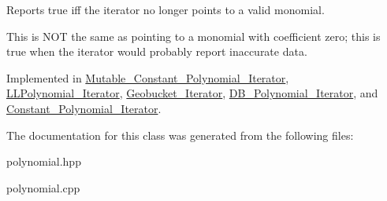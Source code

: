 Reports true iff the iterator no longer points to a valid monomial. 

This is N\+OT the same as pointing to a monomial with coefficient zero; this is true when the iterator would probably report inaccurate data. 

Implemented in \hyperlink{class_mutable___constant___polynomial___iterator_a5b6d56b68ad61ecaaf27f8370d1c2d31}{Mutable\+\_\+\+Constant\+\_\+\+Polynomial\+\_\+\+Iterator}, \hyperlink{class_l_l_polynomial___iterator_aed442195d521dc796f86c1216223c022}{L\+L\+Polynomial\+\_\+\+Iterator}, \hyperlink{class_geobucket___iterator_a5845016f7b9cb2c7538cef310af0b102}{Geobucket\+\_\+\+Iterator}, \hyperlink{class_d_b___polynomial___iterator_a5d81456e74a757cf6769ce17d37b82ce}{D\+B\+\_\+\+Polynomial\+\_\+\+Iterator}, and \hyperlink{class_constant___polynomial___iterator_aad50167fd2010a1a5c09358c777d40e0}{Constant\+\_\+\+Polynomial\+\_\+\+Iterator}.



The documentation for this class was generated from the following files\+:\begin{DoxyCompactItemize}
\item 
polynomial.\+hpp\item 
polynomial.\+cpp\end{DoxyCompactItemize}
